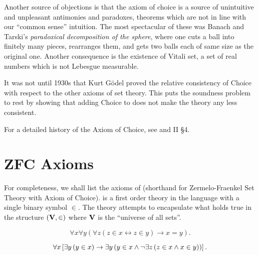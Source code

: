 Another source of objections is that the axiom of choice is a source of unintuitive and unpleasant antimonies and paradoxes,
theorems which are not in line with our ``common sense'' intuition.
The most spectacular of these was Banach and Tarski's \emph{paradoxical decomposition of the sphere},
where one cuts a ball into finitely many pieces, rearranges them, and gets two balls each of same size as the original one.
Another consequence is the existence of Vitali set, a set of real numbers which is not Lebesgue measurable.

It was not until 1930s that Kurt Gödel proved the relative consistency of Choice with respect to the other axioms of set theory.
This puts the soundness problem to rest by showing that adding Choice to \ZF does not make the theory any less consistent.

For a detailed history of the Axiom of Choice, see \autocite{moore1982} and \autocite{fraenkel1973} II \S 4.

\section{ZFC Axioms}

For completeness, we shall list the axioms of \ZFC (shorthand for Zermelo-Fraenkel Set Theory with Axiom of Choice).
\ZFC is a first order theory in the language with a single binary symbol \(\in\).
The theory attempts to encapsulate what holds true in the structure \((\mathbf{V},\in)\) where \(\mathbf{V}\) is the ``universe of all sets''.

\begin{axiom}[Extensionality]
    \[ \forall x \forall y \left( \forall z\left(z\in x\leftrightarrow z\in y\right) \rightarrow x = y \right). \]
\end{axiom}

\begin{axiom}[Foundation]
    \[ \forall x \left[  \exists y \left(y\in x\right) \to \exists y \left(y\in x\land \lnot\exists z\left(z\in x\land x\in y\right)\right)  \right] .\]
\end{axiom}

